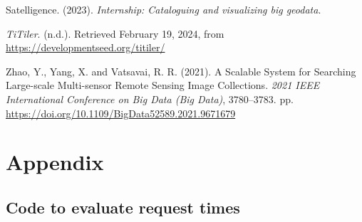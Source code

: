 \documentclass[
  oneside,
  open=any]{scrbook}
\newlength{\cslhangindent}
\newenvironment{CSLReferences}[2] %
 {\begin{list}{}{%
  \setlength{\itemindent}{0pt}
  \setlength{\leftmargin}{0pt}
  \setlength{\parsep}{0pt}
  \ifodd #1
   \setlength{\leftmargin}{\cslhangindent}
   \setlength{\itemindent}{-1\cslhangindent}
  \fi
  \setlength{\itemsep}{#2\baselineskip}}}
 {\end{list}}
\begin{document}
\begin{CSLReferences}{1}{0}
Satelligence. (2023). \emph{Internship: {Cataloguing} and visualizing
big geodata}.

\emph{{TiTiler}}. (n.d.). Retrieved February 19, 2024, from
\url{https://developmentseed.org/titiler/}

Zhao, Y., Yang, X. and Vatsavai, R. R. (2021). A {Scalable} {System} for
{Searching} {Large}-scale {Multi}-sensor {Remote} {Sensing} {Image}
{Collections}. \emph{2021 {IEEE} {International} {Conference} on {Big}
{Data} ({Big} {Data})}, 3780--3783. pp.
\url{https://doi.org/10.1109/BigData52589.2021.9671679}

\end{CSLReferences}

\chapter{Appendix}\label{appendix}

\section{Code to evaluate request
times}\label{code-to-evaluate-request-times}
\end{document}
